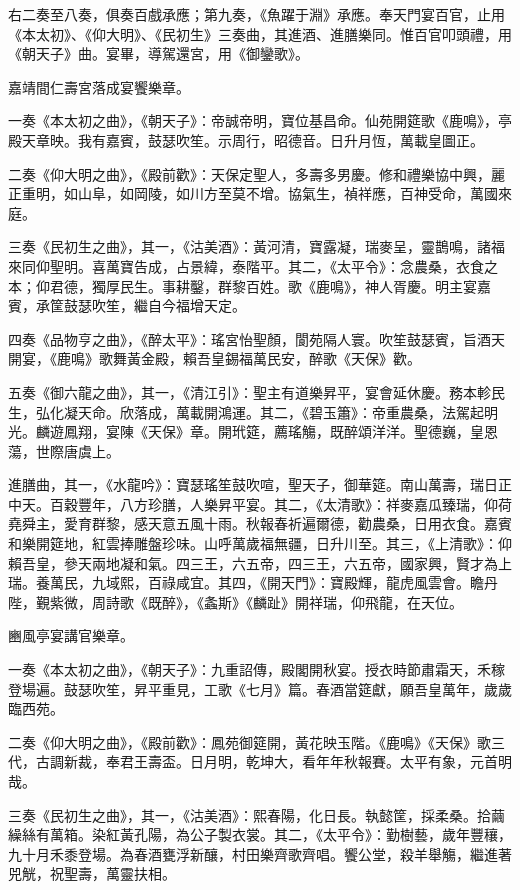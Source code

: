 右二奏至八奏，俱奏百戲承應；第九奏，《魚躍于淵》承應。奉天門宴百官，止用《本太初》、《仰大明》、《民初生》三奏曲，其進酒、進膳樂同。惟百官叩頭禮，用《朝天子》曲。宴畢，導駕還宮，用《御鑾歌》。

嘉靖間仁壽宮落成宴饗樂章。

一奏《本太初之曲》，《朝天子》：帝誠帝明，寶位基昌命。仙苑開筵歌《鹿鳴》，亭殿天章映。我有嘉賓，鼓瑟吹笙。示周行，昭德音。日升月恆，萬載皇圖正。

二奏《仰大明之曲》，《殿前歡》：天保定聖人，多壽多男慶。修和禮樂協中興，麗正重明，如山阜，如岡陵，如川方至莫不增。協氣生，禎祥應，百神受命，萬國來庭。

三奏《民初生之曲》，其一，《沽美酒》：黃河清，寶露凝，瑞麥呈，靈鵲鳴，諸福來同仰聖明。喜萬寶告成，占景緯，泰階平。其二，《太平令》：念農桑，衣食之本；仰君德，獨厚民生。事耕鑿，群黎百姓。歌《鹿鳴》，神人胥慶。明主宴嘉賓，承筐鼓瑟吹笙，繼自今福增天定。

四奏《品物亨之曲》，《醉太平》：瑤宮怡聖顏，閬苑隔人寰。吹笙鼓瑟賓，旨酒天開宴，《鹿鳴》歌舞黃金殿，賴吾皇錫福萬民安，醉歌《天保》歡。

五奏《御六龍之曲》，其一，《清江引》：聖主有道樂昇平，宴會延休慶。務本軫民生，弘化凝天命。欣落成，萬載開鴻運。其二，《碧玉簫》：帝重農桑，法駕起明光。麟遊鳳翔，宴陳《天保》章。開玳筵，薦瑤觴，既醉頌洋洋。聖德巍，皇恩蕩，世際唐虞上。

進膳曲，其一，《水龍吟》：寶瑟瑤笙鼓吹喧，聖天子，御華筵。南山萬壽，瑞日正中天。百穀豐年，八方珍膳，人樂昇平宴。其二，《太清歌》：祥麥嘉瓜臻瑞，仰荷堯舜主，愛育群黎，感天意五風十雨。秋報春祈遍爾德，勸農桑，日用衣食。嘉賓和樂開筵地，紅雲捧雕盤珍味。山呼萬歲福無疆，日升川至。其三，《上清歌》：仰賴吾皇，參天兩地凝和氣。四三王，六五帝，四三王，六五帝，國家興，賢才為上瑞。養萬民，九域熙，百祿咸宜。其四，《開天門》：寶殿輝，龍虎風雲會。瞻丹陛，覲紫微，周詩歌《既醉》，《螽斯》《麟趾》開祥瑞，仰飛龍，在天位。

豳風亭宴講官樂章。

一奏《本太初之曲》，《朝天子》：九重詔傳，殿閣開秋宴。授衣時節肅霜天，禾稼登場遍。鼓瑟吹笙，昇平重見，工歌《七月》篇。春酒當筵獻，願吾皇萬年，歲歲臨西苑。

二奏《仰大明之曲》，《殿前歡》：鳳苑御筵開，黃花映玉階。《鹿鳴》《天保》歌三代，古調新裁，奉君王壽盃。日月明，乾坤大，看年年秋報賽。太平有象，元首明哉。

三奏《民初生之曲》，其一，《沽美酒》：熙春陽，化日長。執懿筐，採柔桑。拾繭繰絲有萬箱。染紅黃孔陽，為公子製衣裳。其二，《太平令》：勤樹藝，歲年豐穰，九十月禾黍登場。為春酒甕浮新釀，村田樂齊歌齊唱。饗公堂，殺羊舉觴，繼進著兕觥，祝聖壽，萬靈扶相。

